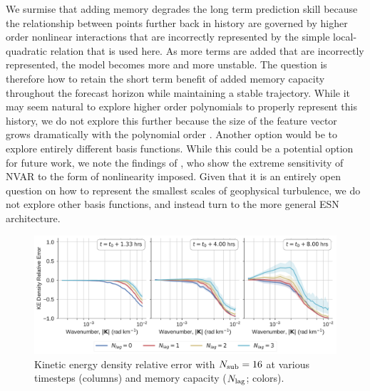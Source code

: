 We surmise that adding memory degrades the long term prediction skill because
the relationship between points further back in history are governed by higher
order nonlinear interactions that are incorrectly represented by
the simple local-quadratic relation that is used here.
As more terms are added that are incorrectly represented, the model becomes
more and more unstable.
The question is therefore how to retain the short term benefit of added memory
capacity throughout the forecast horizon while maintaining a stable trajectory.
While it may seem natural to explore higher order polynomials to
properly represent this history, we do not explore this further because the size
of the feature vector grows dramatically with the polynomial order
\citep{chen_next_2022}.
Another option would be to explore entirely different basis functions.
While this could be a potential option for future work, we note the findings of
\citet{zhang_catch-22_2022}, who show the extreme sensitivity of NVAR to the
form of nonlinearity imposed.
Given that it is an entirely open question on how to represent the smallest
scales of geophysical turbulence, we do not explore other basis functions, and
instead turn to the more general ESN architecture.

\begin{figure}
    \centering
    \includegraphics[width=\textwidth]{../figures/nvar_ke_relerr_vs_lag.pdf}
    \caption{Kinetic energy density relative error with $N_\text{sub}=16$ at various
        timesteps (columns) and memory capacity ($N_\text{lag}$; colors).
    }
    \label{fig:nvar_ke_vs_lag}
\end{figure}
